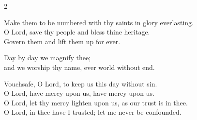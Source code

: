 \documentclass[12pt]{book}
\begin{document}
\begin{multicols}{2}
\begin{enpars}
Make them to be numbered with thy saints in glory everlasting.\\
O Lord, save thy people and bless thine heritage.\\
Govern them and lift them up for ever.

Day by day we magnify thee;\\
and we worship thy name, ever world without end.

Vouchsafe, O Lord, to keep us this day without sin.\\
O Lord, have mercy upon us, have mercy upon us.\\
O Lord, let thy mercy lighten upon us, as our trust is in thee.\\
O Lord, in thee have I trusted; let me never be confounded.

\end{enpars}
\end{multicols}

\end{document}
